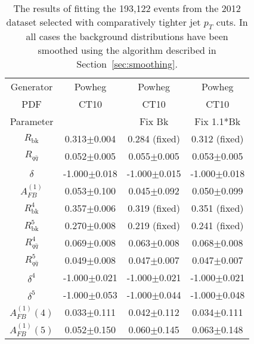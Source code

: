 \documentclass{cmspaperpdf}
\begin{document}
\begin{table}[hbt]
\begin{center}
\caption{\small \label{tab:restricted_eta_space_data} The results of fitting the 193,122 events from the 2012 dataset selected with comparatively tighter jet $p_{T}$ cuts. In all cases the background distributions have been smoothed using the algorithm described in Section~\ref{sec:smoothing}.}
\vspace{3pt}
\begin{tabular}{|c|c|c|c|}\hline
Generator          & Powheg           & Powheg           & Powheg            \\
   PDF             & CT10             & CT10             & CT10              \\
Parameter          &                  & Fix Bk           & Fix 1.1*Bk        \\
\hline
$R_\mathrm{bk}$    & 0.313$\pm$0.004  & 0.284 (fixed)    & 0.312 (fixed)     \\
$R_{q\bar q}$      & 0.052$\pm$0.005  & 0.055$\pm$0.005  & 0.053$\pm$0.005   \\
$\delta$           & -1.000$\pm$0.018 & -1.000$\pm$0.015 & -1.000$\pm$0.018  \\
$A^{(1)}_{FB}$     & 0.053$\pm$0.100  & 0.045$\pm$0.092  & 0.050$\pm$0.099   \\
\hline
$R^4_\mathrm{bk}$  & 0.357$\pm$0.006  & 0.319 (fixed)    & 0.351 (fixed)     \\
$R^5_\mathrm{bk}$  & 0.270$\pm$0.008  & 0.219 (fixed)    & 0.241 (fixed)     \\
$R^4_{q\bar q}$    & 0.069$\pm$0.008  & 0.063$\pm$0.008  & 0.068$\pm$0.008   \\
$R^5_{q\bar q}$    & 0.049$\pm$0.008  & 0.047$\pm$0.007  & 0.047$\pm$0.007   \\
$\delta^4$         & -1.000$\pm$0.021 & -1.000$\pm$0.021 & -1.000$\pm$0.021  \\
$\delta^5$         & -1.000$\pm$0.053 & -1.000$\pm$0.044 & -1.000$\pm$0.048  \\
$A^{(1)}_{FB}(4)$  & 0.033$\pm$0.111  & 0.042$\pm$0.112  & 0.034$\pm$0.111   \\
$A^{(1)}_{FB}(5)$  & 0.052$\pm$0.150  & 0.060$\pm$0.145  & 0.063$\pm$0.148   \\
\hline
\end{tabular}
\end{center}
\end{table}
\end{document}
